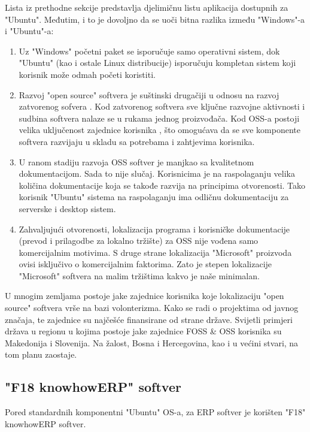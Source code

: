 \documentclass[times, utf8, seminar]{fit}
\begin{document}
Lista iz prethodne sekcije predstavlja djelimičnu listu aplikacija dostupnih za "Ubuntu". Međutim, i to je dovoljno da se uoči bitna razlika između "Windows"-a i "Ubuntu"-a:
\begin{enumerate}
  \item Uz "Windows" početni paket se isporučuje samo operativni sistem, dok "Ubuntu" (kao i ostale Linux distribucije) isporučuju kompletan sistem koji korisnik može odmah početi koristiti.
  \item Razvoj "open source" softvera je suštinski drugačiji u odnosu na razvoj zatvorenog sofvera \citep{bazaar}. Kod zatvorenog softvera sve ključne razvojne aktivnosti i sudbina softvera nalaze se u rukama jednog proizvođača. Kod OSS-a postoji velika uključenost zajednice korisnika , što omogućava da se sve komponente softvera razvijaju u skladu sa potrebama i zahtjevima korisnika. 
  \item U ranom stadiju razvoja OSS softver je manjkao sa kvalitetnom dokumentacijom. Sada to nije slučaj. Korisnicima je na raspolaganju velika količina dokumentacije koja se takođe razvija na principima otvorenosti. Tako korisnik "Ubuntu" sistema na raspolaganju ima odličnu dokumentaciju za serverske \citep{ubuntudesktop} i desktop \citep{ubuntuserver} sistem.
  \item Zahvaljujući otvorenosti, lokalizacija programa i korisničke dokumentacije (prevod i prilagodbe za lokalno tržište) za OSS nije vođena samo komercijalnim motivima. S druge strane lokalizacija "Microsoft" proizvoda ovisi isključivo o komercijalnim faktorima. Zato je stepen lokalizacije "Microsoft" softvera na malim tržištima kakvo je naše minimalan.   
\end{enumerate}

U mnogim zemljama postoje jake zajednice korisnika koje lokalizaciju "open source" softvera vrše na bazi volonterizma. Kako se radi o projektima od javnog značaja, te zajednice su najčešće finansirane od strane države. 
Svijetli primjeri država u regionu u kojima postoje jake zajednice FOSS  \& OSS  korisnika su Makedonija i Slovenija.
Na žalost, Bosna i Hercegovina, kao i u većini stvari, na tom planu zaostaje. 

\subsection{"F18 knowhowERP" softver}
Pored standardnih komponentni "Ubuntu" OS-a, za ERP softver je korišten "F18" knowhowERP softver.
\end{document}
